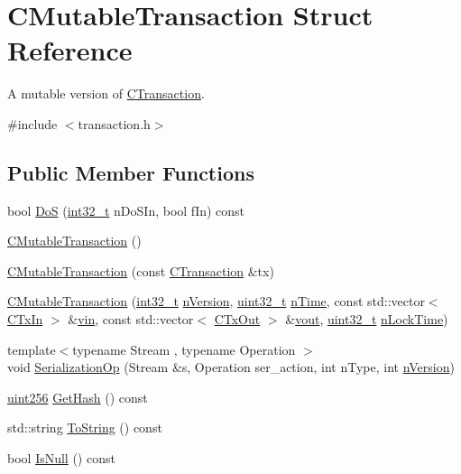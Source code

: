 \hypertarget{struct_c_mutable_transaction}{}\section{C\+Mutable\+Transaction Struct Reference}
\label{struct_c_mutable_transaction}


A mutable version of \hyperlink{class_c_transaction}{C\+Transaction}.  




{\ttfamily \#include $<$transaction.\+h$>$}

\subsection*{Public Member Functions}
\begin{DoxyCompactItemize}
\item 
bool \hyperlink{struct_c_mutable_transaction_adf8bc8022a91b403961c2c5d07d5947a}{Do\+S} (\hyperlink{stdint_8h_ab1967d8591af1a4e48c37fd2b0f184d0}{int32\+\_\+t} n\+Do\+S\+In, bool f\+In) const 
\item 
\hyperlink{struct_c_mutable_transaction_a496bf823977ef8b178f5128b0f28dcb5}{C\+Mutable\+Transaction} ()
\item 
\hyperlink{struct_c_mutable_transaction_abb693b3e8d26fa6ecabc93d0f089e995}{C\+Mutable\+Transaction} (const \hyperlink{class_c_transaction}{C\+Transaction} \&tx)
\item 
\hyperlink{struct_c_mutable_transaction_a3188d01d1b716bba1d92b9cd1fdd4c83}{C\+Mutable\+Transaction} (\hyperlink{stdint_8h_ab1967d8591af1a4e48c37fd2b0f184d0}{int32\+\_\+t} \hyperlink{struct_c_mutable_transaction_a23d7f377dce887f5b37539b0bf51733e}{n\+Version}, \hyperlink{stdint_8h_a435d1572bf3f880d55459d9805097f62}{uint32\+\_\+t} \hyperlink{struct_c_mutable_transaction_a7638f0f1222fac9b3a258cd4bf7bc13e}{n\+Time}, const std\+::vector$<$ \hyperlink{class_c_tx_in}{C\+Tx\+In} $>$ \&\hyperlink{struct_c_mutable_transaction_ad6b1a0a773293fd153a1d384923631da}{vin}, const std\+::vector$<$ \hyperlink{class_c_tx_out}{C\+Tx\+Out} $>$ \&\hyperlink{struct_c_mutable_transaction_aca14a252c78e4af2dfe68d7ea67a77dc}{vout}, \hyperlink{stdint_8h_a435d1572bf3f880d55459d9805097f62}{uint32\+\_\+t} \hyperlink{struct_c_mutable_transaction_ae9685a37d424cd00e3badda28260c848}{n\+Lock\+Time})
\item 
{\footnotesize template$<$typename Stream , typename Operation $>$ }\\void \hyperlink{struct_c_mutable_transaction_a31e7420656b9a31ca6ea44095ce726d9}{Serialization\+Op} (Stream \&s, Operation ser\+\_\+action, int n\+Type, int \hyperlink{struct_c_mutable_transaction_a23d7f377dce887f5b37539b0bf51733e}{n\+Version})
\item 
\hyperlink{classuint256}{uint256} \hyperlink{struct_c_mutable_transaction_af57dc15618f64c9ae3a4c0e06850e382}{Get\+Hash} () const 
\item 
std\+::string \hyperlink{struct_c_mutable_transaction_a235803da94d1cb222d51b6f81146de18}{To\+String} () const 
\item 
bool \hyperlink{struct_c_mutable_transaction_ad963e98b08d5adf4c0a9cf0ea810e754}{Is\+Null} () const 
\end{DoxyCompactItemize}
